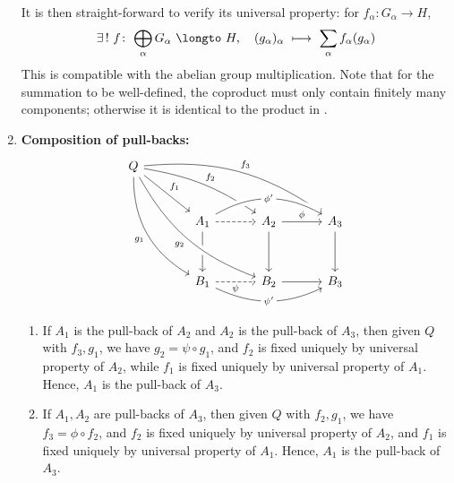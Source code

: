 \documentclass[a4paper,10pt]{article}
\begin{document}
\begin{enumerate}
	It is then straight-forward to verify its universal property: for $f_\alpha\colon G_\alpha\to H$,
	\begin{equation}
		\exists\,!\ f\colon\,%
			\bigoplus_\alpha G_\alpha
			\ \longto\ H,\quad
		(g_\alpha)_\alpha
			\ \longmapsto\ %
			\sum_\alpha f_\alpha(g_\alpha)
	\end{equation}
	This is compatible with the abelian group multiplication. Note that for the summation to be well-defined, the coproduct must only contain finitely many components; otherwise it is identical to the product in . 
	\qedfull
	
	\item \textbf{Composition of pull-backs:}
	\begin{equation}
	\begin{tikzcd}[row sep=7.5ex,column sep=7.5ex]
		Q
			\arrow[ddr,bend right,"g_1",swap]
			\arrow[dr,"f_1"]
			\arrow[drr,"f_2",bend left=12]
			\arrow[drrr,"f_3",bend left=20]
		&[1ex] && \\[-1ex]
		& A_1
			\arrow[rr,"\phi'" description
				,bend left,swap
				,crossing over]
			\arrow[r,dashed]
			\arrow[d] &
		A_2
			\arrow[d]
			\arrow[r,"\phi"] &
		A_3
			\arrow[d] \\
		& B_1
			\arrow[rr,"\psi'" description
				,bend right=25,swap]
			\arrow[r,"\psi",swap,dashed] &
		B_2
			\arrow[from=uull,"g_2",swap
				,bend right=20
				,crossing over]
			\arrow[r] &
		B_3
	\end{tikzcd}
	\end{equation}
	
	\begin{enumerate}
	\item If $A_1$ is the pull-back of $A_2$ and $A_2$ is the pull-back of $A_3$, then given $Q$ with $f_3,g_1$, we have $g_2 = \psi\circ g_1$, and $f_2$ is fixed uniquely by universal property of $A_2$, while $f_1$ is fixed uniquely by universal property of $A_1$. Hence, $A_1$ is the pull-back of $A_3$. 
	
	\item If $A_1,A_2$ are pull-backs of $A_3$, then given $Q$ with $f_2,g_1$, we have $f_3 = \phi\circ f_2$, and $f_2$ is fixed uniquely by universal property of $A_2$, and $f_1$ is fixed uniquely by universal property of $A_1$. Hence, $A_1$ is the pull-back of $A_3$. 
	
	\end{enumerate}
	
	
	\end{enumerate}
	
\end{document}
